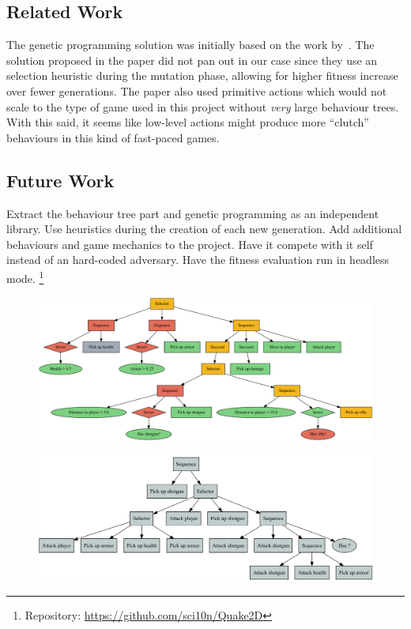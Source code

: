 \documentclass[a4paper, twocolumn]{article}
\begin{document}
    \subsection*{Related Work}

    The genetic programming solution was initially based on the work by~\cite{colledanchise2015learning}. The solution proposed in the paper did not pan out in our case since they use an selection heuristic during the mutation phase, allowing for higher fitness increase over fewer generations. The paper also used primitive actions which would not scale to the type of game used in this project without \emph{very} large behaviour trees. With this said, it seems like low-level actions might produce more ``clutch'' behaviours in this kind of fast-paced games. 


    \subsection*{Future Work}

    Extract the behaviour tree part and genetic programming as an independent library. Use heuristics during the creation of each new generation. Add additional behaviours and game mechanics to the project. Have it compete with it self instead of an hard-coded adversary. Have the fitness evaluation run in headless mode. \footnote{Repository: \url{https://github.com/sci10n/Quake2D}}

    \nocite{*} %
    
    

    \onecolumn
    \clearpage

    \appendix

    \thispagestyle{empty}

    \begin{figure}[H]
        \centering
        \includegraphics[angle=90,height=0.98\textheight]{share/hand_crafted_behaviour_tree.pdf}
    \end{figure}

    \clearpage

    \thispagestyle{empty}

    \begin{figure}[H]
        \centering
        \includegraphics[angle=90,height=0.98\textheight]{share/tree-fitness-3780.png}
    \end{figure}
\end{document}
